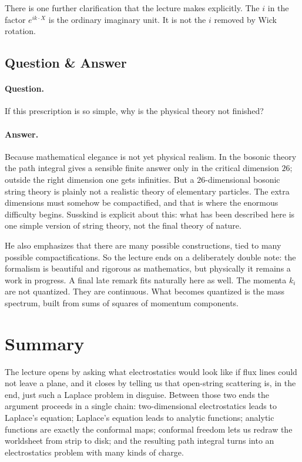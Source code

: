 There is one further clarification that the lecture makes explicitly. The \(i\) in the factor \(e^{ik\cdot X}\) is the ordinary imaginary unit. It is not the \(i\) removed by Wick rotation.

\subsection{Question \& Answer}

\paragraph{Question.} If this prescription is so simple, why is the physical theory not finished?

\paragraph{Answer.} Because mathematical elegance is not yet physical realism. In the bosonic theory the path integral gives a sensible finite answer only in the critical dimension \(26\); outside the right dimension one gets infinities. But a \(26\)-dimensional bosonic string theory is plainly not a realistic theory of elementary particles. The extra dimensions must somehow be compactified, and that is where the enormous difficulty begins. Susskind is explicit about this: what has been described here is one simple version of string theory, not the final theory of nature.

He also emphasizes that there are many possible constructions, tied to many possible compactifications. So the lecture ends on a deliberately double note: the formalism is beautiful and rigorous as mathematics, but physically it remains a work in progress. A final late remark fits naturally here as well. The momenta \(k_i\) are not quantized. They are continuous. What becomes quantized is the mass spectrum, built from sums of squares of momentum components.

\section{Summary}

The lecture opens by asking what electrostatics would look like if flux lines could not leave a plane, and it closes by telling us that open-string scattering is, in the end, just such a Laplace problem in disguise. Between those two ends the argument proceeds in a single chain: two-dimensional electrostatics leads to Laplace's equation; Laplace's equation leads to analytic functions; analytic functions are exactly the conformal maps; conformal freedom lets us redraw the worldsheet from strip to disk; and the resulting path integral turns into an electrostatics problem with many kinds of charge.

